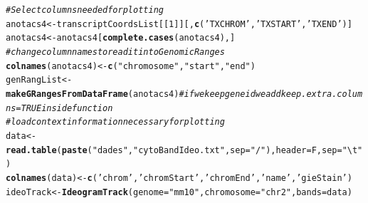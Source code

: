 \documentclass[a4paper,10pt]{article}\usepackage[]{graphicx}\usepackage[]{color}
\makeatletter
\newcommand{\hlnum}[1]{\textcolor[rgb]{0.686,0.059,0.569}{#1}}%
\newcommand{\hlstr}[1]{\textcolor[rgb]{0.192,0.494,0.8}{#1}}%
\newcommand{\hlcom}[1]{\textcolor[rgb]{0.678,0.584,0.686}{\textit{#1}}}%
\newcommand{\hlstd}[1]{\textcolor[rgb]{0.345,0.345,0.345}{#1}}%
\newcommand{\hlkwb}[1]{\textcolor[rgb]{0.69,0.353,0.396}{#1}}%
\newcommand{\hlkwc}[1]{\textcolor[rgb]{0.333,0.667,0.333}{#1}}%
\newcommand{\hlkwd}[1]{\textcolor[rgb]{0.737,0.353,0.396}{\textbf{#1}}}%
\newenvironment{kframe}{%
 \def\at@end@of@kframe{}%
 \ifinner\ifhmode%
  \def\at@end@of@kframe{\end{minipage}}%
  \begin{minipage}{\columnwidth}%
 \fi\fi%
 \def\FrameCommand##1{\hskip\@totalleftmargin \hskip-\fboxsep
 \colorbox{shadecolor}{##1}\hskip-\fboxsep
     \hskip-\linewidth \hskip-\@totalleftmargin \hskip\columnwidth}%
 \MakeFramed {\advance\hsize-\width
   \@totalleftmargin\z@ \linewidth\hsize
   \@setminipage}}%
 {\par\unskip\endMakeFramed%
 \at@end@of@kframe}
\newenvironment{knitrout}{}{} %
\makeatother
\begin{document}
\begin{knitrout}
\color{fgcolor}\begin{kframe}
\begin{alltt}
\hlcom{# Select columns needed for plotting  }
\hlstd{anotacs4}\hlkwb{<-}\hlstd{transcriptCoordsList[[}\hlnum{1}\hlstd{]][,}\hlkwd{c}\hlstd{(}\hlstr{'TXCHROM'}\hlstd{,} \hlstr{'TXSTART'}\hlstd{,} \hlstr{'TXEND'}\hlstd{)]}
\hlstd{anotacs4}\hlkwb{<-}\hlstd{anotacs4[}\hlkwd{complete.cases}\hlstd{(anotacs4),]}
\hlcom{#change column names to read it into GenomicRanges}
\hlkwd{colnames}\hlstd{(anotacs4)}\hlkwb{<-}\hlkwd{c}\hlstd{(}\hlstr{"chromosome"}\hlstd{,}\hlstr{"start"}\hlstd{,}\hlstr{"end"}\hlstd{)}
\hlstd{genRangList}\hlkwb{<-}\hlkwd{makeGRangesFromDataFrame}\hlstd{(anotacs4)} \hlcom{#if we keep geneid we add keep.extra.columns=TRUE inside function}
\hlcom{# load context information necessary for plotting}
\hlstd{data} \hlkwb{<-} \hlkwd{read.table}\hlstd{(}\hlkwd{paste}\hlstd{(}\hlstr{"dades"}\hlstd{,}\hlstr{"cytoBandIdeo.txt"}\hlstd{,} \hlkwc{sep}\hlstd{=}\hlstr{"/"}\hlstd{),} \hlkwc{header}\hlstd{=F,} \hlkwc{sep}\hlstd{=}\hlstr{"\textbackslash{}t"}\hlstd{)}
\hlkwd{colnames}\hlstd{(data)} \hlkwb{<-}\hlkwd{c}\hlstd{(}\hlstr{'chrom'}\hlstd{,} \hlstr{'chromStart'}\hlstd{,} \hlstr{'chromEnd'}\hlstd{,} \hlstr{'name'}\hlstd{,} \hlstr{'gieStain'}\hlstd{)}
\hlstd{ideoTrack} \hlkwb{<-} \hlkwd{IdeogramTrack}\hlstd{(}\hlkwc{genome}\hlstd{=}\hlstr{"mm10"}\hlstd{,}\hlkwc{chromosome} \hlstd{=} \hlstr{"chr2"}\hlstd{,} \hlkwc{bands}\hlstd{=data)}


\end{alltt}
\end{kframe}
\end{knitrout}
\end{document}
